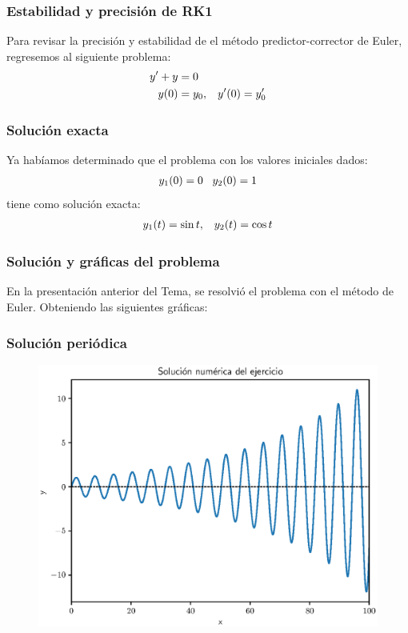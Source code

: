 \documentclass[12pt]{beamer}
\begin{document}
\begin{frame}
\frametitle{Estabilidad y precisión de RK1}
Para revisar la precisión y estabilidad de el método predictor-corrector de Euler, regresemos al siguiente problema:
\pause
\begin{align}
{y}^{\prime} + y &= 0 \label{eq:ecuacion_12_19} \\
y(0) &=  y_{0}, \hspace{0.3cm} {y}^{\prime} (0) = {y}^{\prime}_{0} \label{ec:ecuacion_12_20}
\end{align}
\end{frame}
\begin{frame}
\frametitle{Solución exacta}
Ya habíamos determinado que el problema con los valores iniciales dados:
\pause
\begin{align*}
y_{1} (0) = 0 \hspace{0.3cm} y_{2} (0) = 1
\end{align*}
tiene como solución exacta:
\pause
\begin{align*}
y_{1} (t) = \sin t, \hspace{0.3cm} y_{2} (t) = \cos t
\end{align*}
\end{frame}
\begin{frame}
\frametitle{Solución y gráficas del problema}
En la presentación anterior del Tema, se resolvió el problema con el método de Euler.
\pause
Obteniendo las siguientes gráficas:
\end{frame}
\begin{frame}
\frametitle{Solución periódica}
\begin{figure}
    \centering
    \includegraphics[scale=0.55]{Imagenes/plot_euler_ejercicio_04.eps}
\end{figure}
\end{frame}
\end{document}
